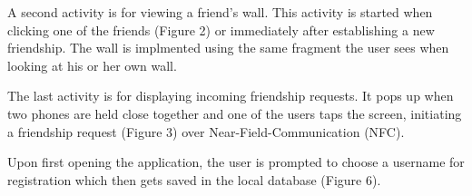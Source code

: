 \documentclass{report}
\begin{document}
\begin{figure}[H]
	\centering
	\hfill
	\hfill
	
\end{figure}

A second activity is for viewing a friend's wall. This activity is started when clicking one of the friends (Figure 2) or immediately after establishing a new friendship. The wall is implmented using the same fragment the user sees when looking at his or her own wall.\newline

The last activity is for displaying incoming friendship requests. It pops up when two phones are held close together and one of the users taps the screen, initiating a friendship request (Figure 3) over Near-Field-Communication (NFC).

Upon first opening the application, the user is prompted to choose a username for registration which then gets saved in the local database (Figure 6).
\end{document}
